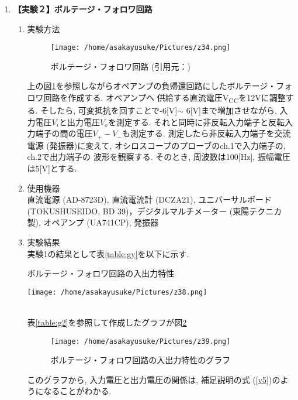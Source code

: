 \documentclass[uplatex,a4paper,11pt,dvipdfmxs]{jsarticle}
\begin{document}
\begin{enumerate}
\begin{enumerate}
    \end{enumerate}
    \item {\bf \large 【実験２】ボルテージ・フォロワ回路}\\
    \begin{enumerate}
        \item[4.1]実験方法\\
        \begin{figure}[H]
            \centering
            \texttt{[image: /home/asakayusuke/Pictures/z34.png]}
            \caption{ボルテージ・フォロワ回路 (引用元：\cite{Okumura})}
            \label{figure:gq}
        \end{figure}
        上の図\ref{figure:gq}を参照しながらオペアンプの負帰還回路にしたボルテージ・フォロワ回路を作成する. オペアンプへ
        供給する直流電圧V\textsubscript{CC}を12Vに調整する. そしたら, 可変抵抗を回すことで-6[V]\(\sim \) 6[V]まで増加させながら, 
        入力電圧\(V_i\)と出力電圧\(V_o\)を測定する. それと同時に非反転入力端子と反転入力端子の間の電圧\(V_+-V_-\)も測定する. 
        測定したら非反転入力端子を交流電源 (発振器)に変えて, オシロスコープのプローブのch.1で入力端子の, ch.2で出力端子の
        波形を観察する. そのとき, 周波数は100[Hz], 振幅電圧は5[V]とする. \\

        \item[4.2]使用機器\\
        直流電源 (AD-8723D), 直流電流計 (DCZA21), ユニバーサルボード (TOKUSHUSEIDO, BD 39)，デジタルマルチメーター (東陽テクニカ製), 
        オペアンプ (UA741CP), 発振器\\

        \item[4.3] 実験結果\\
        実験1の結果として表\ref{table:gy}を以下に示す.
        \begin{table}[H]
            \centering
            \caption{ボルテージ・フォロワ回路の入出力特性}
            \label{table:g2}
            \texttt{[image: /home/asakayusuke/Pictures/z38.png]}
        \end{table}
        \\
        表\ref{table:g2}を参照して作成したグラフが図\ref{figure:io}\\
        \begin{figure}[H]
            \centering
            \texttt{[image: /home/asakayusuke/Pictures/z39.png]}
            \caption{ボルテージ・フォロワ回路の入出力特性のグラフ}
            \label{figure:io}
        \end{figure}
        このグラフから, 入力電圧と出力電圧の関係は, 補足説明の式 (\ref{v5})のようになることがわかる.\\


\end{enumerate}
\end{enumerate}
\end{document}
